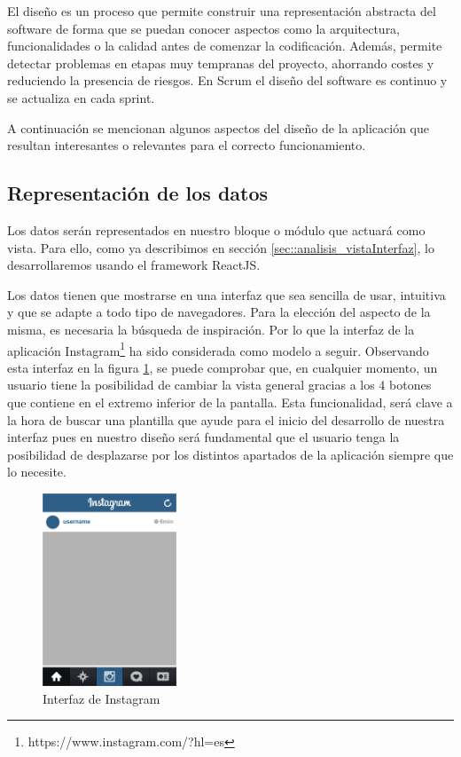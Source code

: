 El diseño es un proceso que permite construir una representación abstracta del software de forma que se puedan conocer aspectos como la arquitectura, funcionalidades o la calidad antes de comenzar la codificación. Además, permite detectar problemas en etapas muy tempranas del proyecto, ahorrando costes y reduciendo la presencia de riesgos. En Scrum el diseño del software es continuo y se actualiza en cada sprint.

A continuación se mencionan algunos aspectos del diseño de la aplicación que resultan interesantes o relevantes para el correcto funcionamiento.

\subsection{Representación de los datos}

Los datos serán representados en nuestro bloque o módulo que actuará como vista. Para ello, como ya describimos en sección \ref{sec::analisis_vistaInterfaz}, lo desarrollaremos usando el framework ReactJS.

Los datos tienen que mostrarse en una interfaz que sea sencilla de usar, intuitiva y que se adapte a todo tipo de navegadores. Para la elección del aspecto de la misma, es necesaria la búsqueda de inspiración. Por lo que la interfaz de la aplicación Instagram\footnote{https://www.instagram.com/?hl=es} ha sido considerada como modelo a seguir. Observando esta interfaz en la figura \ref{fig::insta}, se puede comprobar que, en cualquier momento, un usuario tiene la posibilidad de cambiar la vista general gracias a los 4 botones que contiene en el extremo inferior de la pantalla. Esta funcionalidad, será clave a la hora de buscar una plantilla que ayude para el inicio del desarrollo de nuestra interfaz pues en nuestro diseño será fundamental que el usuario tenga la posibilidad de desplazarse por los distintos apartados de la aplicación siempre que lo necesite.

\begin{figure}[htbp]
    \centerline{\includegraphics[width=4cm]{figuras/insta.jpg}}
    \caption{Interfaz de Instagram}
    \label{fig::insta}
\end{figure}

